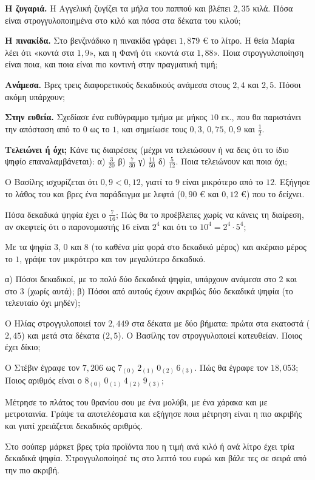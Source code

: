 \ex \textbf{Η ζυγαριά.} Η Αγγελική ζυγίζει τα μήλα του παππού και βλέπει $2{,}35$ κιλά. Πόσα είναι στρογγυλοποιημένα στο κιλό και πόσα στα δέκατα του κιλού;

\ex \textbf{Η πινακίδα.} Στο βενζινάδικο η πινακίδα γράφει $1{,}879$ € το λίτρο. Η θεία Μαρία λέει ότι «κοντά στα $1{,}9$», και η Φανή ότι «κοντά στα $1{,}88$». Ποια στρογγυλοποίηση είναι ποια, και ποια είναι πιο κοντινή στην πραγματική τιμή;

\ex \textbf{Ανάμεσα.} Βρες τρεις διαφορετικούς δεκαδικούς ανάμεσα στους $2{,}4$ και $2{,}5$. Πόσοι ακόμη υπάρχουν;

\ex \textbf{Στην ευθεία.} Σχεδίασε ένα ευθύγραμμο τμήμα με μήκος $10$ εκ., που θα παριστάνει την απόσταση από το $0$ ως το $1$, και σημείωσε τους $0{,}3$, $0{,}75$, $0{,}9$ και $\frac{1}{2}$.

\ex \textbf{Τελειώνει ή όχι;} Κάνε τις διαιρέσεις (μέχρι να τελειώσουν ή να δεις ότι το ίδιο ψηφίο επαναλαμβάνεται): α) $\frac{3}{20}$ \quad β) $\frac{7}{30}$ \quad γ) $\frac{11}{50}$ \quad δ) $\frac{5}{12}$. Ποια τελειώνουν και ποια όχι;


\ex Ο Βασίλης ισχυρίζεται ότι $0{,}9<0{,}12$, γιατί το $9$ είναι μικρότερο από το $12$. Εξήγησε το λάθος του και βρες ένα παράδειγμα με λεφτά ($0{,}90$ € και $0{,}12$ €) που το δείχνει.

\ex Πόσα δεκαδικά ψηφία έχει ο $\frac{7}{16}$; Πώς θα το προέβλεπες χωρίς να κάνεις τη διαίρεση, αν σκεφτείς ότι ο παρονομαστής $16$ είναι $2^4$ και ότι το $10^4=2^4\cdot5^4$;

\ex Με τα ψηφία $3$, $0$ και $8$ (το καθένα μία φορά στο δεκαδικό μέρος) και ακέραιο μέρος το $1$, γράψε τον μικρότερο και τον μεγαλύτερο δεκαδικό.

\ex α) Πόσοι δεκαδικοί, με το πολύ δύο δεκαδικά ψηφία, υπάρχουν ανάμεσα στο $2$ και στο $3$ (χωρίς αυτά); β) Πόσοι από αυτούς έχουν ακριβώς δύο δεκαδικά ψηφία (το τελευταίο όχι μηδέν);

\ex Ο Ηλίας στρογγυλοποιεί τον $2{,}449$ στα δέκατα με δύο βήματα: πρώτα στα εκατοστά ($2{,}45$) και μετά στα δέκατα ($2{,}5$). Ο Βασίλης τον στρογγυλοποιεί κατευθείαν. Ποιος έχει δίκιο;

\ex Ο Στέβιν έγραφε τον $7{,}206$ ως $7_{(0)}\,2_{(1)}\,0_{(2)}\,6_{(3)}$. Πώς θα έγραφε τον $18{,}053$; Ποιος αριθμός είναι ο $8_{(0)}\,0_{(1)}\,4_{(2)}\,9_{(3)}$;


\ex Μέτρησε το πλάτος του θρανίου σου με ένα μολύβι, με ένα χάρακα και με μετροταινία. Γράψε τα αποτελέσματα και εξήγησε ποια μέτρηση είναι η πιο ακριβής και γιατί χρειάζεται δεκαδικός αριθμός.

\ex Στο σούπερ μάρκετ βρες τρία προϊόντα που η τιμή ανά κιλό ή ανά λίτρο έχει τρία δεκαδικά ψηφία. Στρογγυλοποίησέ τις στο λεπτό του ευρώ και βάλε τες σε σειρά από την πιο ακριβή.
